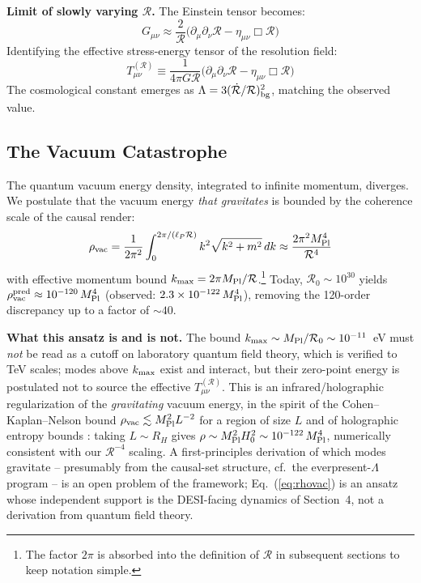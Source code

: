 \documentclass[12pt]{article}
\begin{document}
{\bf Limit of slowly varying $\mathcal{R}$.} The Einstein tensor becomes:
\begin{equation}
G_{\mu\nu} \approx \frac{2}{\mathcal{R}}\bigl(\partial_\mu\partial_\nu\mathcal{R} - \eta_{\mu\nu}\Box\mathcal{R}\bigr)
\end{equation}
Identifying the effective stress-energy tensor of the resolution field:
\begin{equation}
T_{\mu\nu}^{(\mathcal{R})} \equiv \frac{1}{4\pi G\mathcal{R}}\bigl(\partial_\mu\partial_\nu\mathcal{R} - \eta_{\mu\nu}\Box\mathcal{R}\bigr)
\end{equation}
The cosmological constant emerges as $\Lambda = 3(\dot{\mathcal{R}}/\mathcal{R})^2_{\rm bg}$, matching the observed value.

\subsection{The Vacuum Catastrophe}
\label{sec:vacuum}

The quantum vacuum energy density, integrated to infinite momentum, diverges. We postulate that the vacuum energy \emph{that gravitates} is bounded by the coherence scale of the causal render:
\begin{equation}
\rho_{\rm vac} = \frac{1}{2\pi^2}\int_0^{2\pi/(\ell_P\mathcal{R})} k^2\sqrt{k^2+m^2}\,dk \approx \frac{2\pi^2 M_{\rm Pl}^4}{\mathcal{R}^4}
\label{eq:rhovac}
\end{equation}
with effective momentum bound $k_{\rm max} = 2\pi M_{\rm Pl}/\mathcal{R}$.\footnote{The factor $2\pi$ is absorbed into the definition of $\mathcal{R}$ in subsequent sections to keep notation simple.} Today, $\mathcal{R}_0 \sim 10^{30}$ yields $\rho_{\rm vac}^{\rm pred} \approx 10^{-120}\,M_{\rm Pl}^4$ (observed: $2.3\times10^{-122}\,M_{\rm Pl}^4$), removing the 120-order discrepancy up to a factor of $\sim 40$.

{\bf What this ansatz is and is not.} The bound $k_{\rm max} \sim M_{\rm Pl}/\mathcal{R}_0 \sim 10^{-11}$~eV must \emph{not} be read as a cutoff on laboratory quantum field theory, which is verified to TeV scales; modes above $k_{\rm max}$ exist and interact, but their zero-point energy is postulated not to source the effective $T_{\mu\nu}^{(\mathcal{R})}$. This is an infrared/holographic regularization of the \emph{gravitating} vacuum energy, in the spirit of the Cohen--Kaplan--Nelson bound $\rho_{\rm vac} \lesssim M_{\rm Pl}^2 L^{-2}$ for a region of size $L$ \citep{cohen1999} and of holographic entropy bounds \citep{bousso2002}: taking $L \sim R_H$ gives $\rho \sim M_{\rm Pl}^2 H_0^2 \sim 10^{-122}\,M_{\rm Pl}^4$, numerically consistent with our $\mathcal{R}^{-4}$ scaling. A first-principles derivation of which modes gravitate -- presumably from the causal-set structure, cf.\ the everpresent-$\Lambda$ program \citep{sorkin2005,ahmed2004} -- is an open problem of the framework; Eq.~(\ref{eq:rhovac}) is an ansatz whose independent support is the DESI-facing dynamics of Section~4, not a derivation from quantum field theory.
\end{document}

